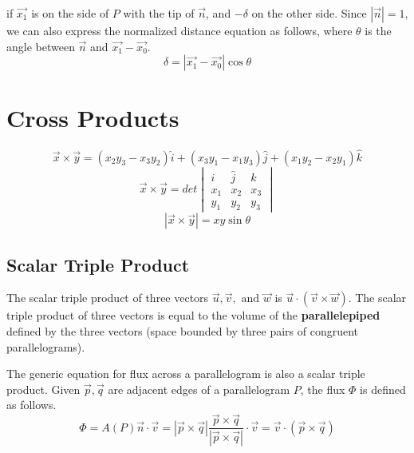 \documentclass[11pt]{article}
\begin{document}
		if $\vec{x_1}$ is on the side of $P$ with the tip of $\vec{n}$, and $-\delta$ on the other side. Since $|\vec{n}| = 1$, we can also express the normalized distance equation as follows, where $\theta$ is the angle between $\vec{n}$ and $\vec{x_1}-\vec{x_0}$.
		\begin{equation}
			\delta = |\vec{x_1}-\vec{x_0}|\cos\theta
		\end{equation}
		
\section{Cross Products}
	\begin{equation}
		\vec{x}\times\vec{y} = (x_2y_3-x_3y_2)\hat{i}+(x_3y_1-x_1y_3)\hat{j}+(x_1y_2-x_2y_1)\hat{k}
	\end{equation}
	\begin{equation}
		\vec{x}\times\vec{y} = det
		\begin{vmatrix}
			\hat{i} & \hat{j} & \hat{k}\\
			x_1 & x_2 & x_3\\
			y_1 & y_2 & y_3
		\end{vmatrix}
	\end{equation}
	\begin{equation}
		|\vec{x}\times\vec{y}| = xy\sin\theta
	\end{equation}
	
	\subsection{Scalar Triple Product}
		The scalar triple product of three vectors $\vec{u}, \vec{v}, \text{ and }\vec{w}$ is $\vec{u}\cdot(\vec{v}\times\vec{w})$. The scalar triple product of three vectors is equal to the volume of the \textbf{parallelepiped} defined by the three vectors (space bounded by three pairs of congruent parallelograms). 
		
		The generic equation for flux across a parallelogram is also a scalar triple product. Given $\vec{p},\vec{q}$ are adjacent edges of a parallelogram $P$, the flux $\Phi$ is defined as follows.
		\begin{equation}
			\Phi = A(P)\vec{n}\cdot\vec{v} = |\vec{p}\times\vec{q}|\frac{\vec{p}\times\vec{q}}{|\vec{p}\times\vec{q}|}\cdot\vec{v} = \vec{v}\cdot(\vec{p}\times\vec{q})
		\end{equation}
\end{document}
